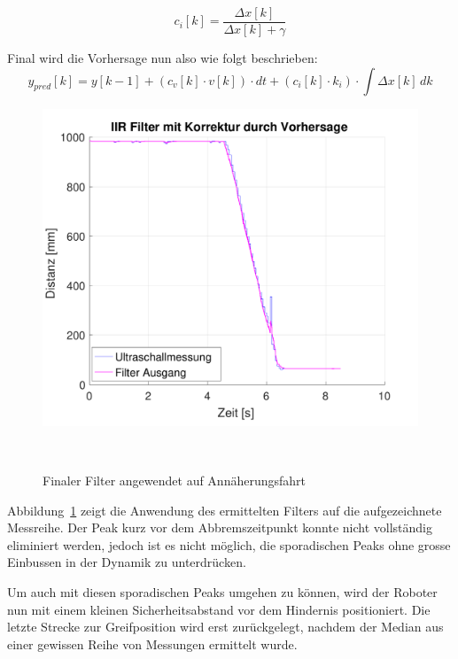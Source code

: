 \documentclass[main.tex]{subfiles} %
\begin{document}
\[
    c_i[k] = \frac{\Delta x[k]}{\Delta x[k] + \gamma}
\]

Final wird die Vorhersage nun also wie folgt beschrieben:
\[
    y_{pred}[k] = y[k - 1] + (c_v[k] \cdot v[k]) \cdot dt + (c_i[k] \cdot k_i) \cdot \int \Delta x[k]\,dk
\]

\begin{figure}[H]
    \centering
    \includegraphics[width=0.5\linewidth]{./fig_Parametrierung_HcSr04/Einfacher_Tiefpass_HcSr04_V_Korrigiert.pdf}
    \caption{Finaler Filter angewendet auf Annäherungsfahrt}~\label{fig:EinfacherTiefpassHcSr04_V_Korrigiert}
\end{figure}

Abbildung~\ref{fig:EinfacherTiefpassHcSr04_V_Korrigiert} zeigt die Anwendung
des ermittelten Filters auf die aufgezeichnete Messreihe. Der Peak kurz vor dem
Abbremszeitpunkt konnte nicht vollständig eliminiert werden, jedoch ist es
nicht möglich, die sporadischen Peaks ohne grosse Einbussen in der Dynamik zu
unterdrücken.

Um auch mit diesen sporadischen Peaks umgehen zu können, wird der Roboter nun
mit einem kleinen Sicherheitsabstand vor dem Hindernis positioniert. Die letzte
Strecke zur Greifposition wird erst zurückgelegt, nachdem der Median aus einer
gewissen Reihe von Messungen ermittelt wurde.
\end{document}
